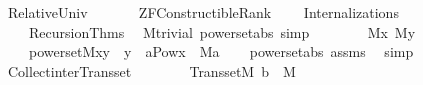 %
\begin{isabellebody}%
%
%
\isadelimdocument
%
\endisadelimdocument
%
\isatagdocument
%
\isamarkuptrue%
%
\endisatagdocument
{\isafolddocument}%
%
\isadelimdocument
%
\endisadelimdocument
%
\isadelimtheory
%
\endisadelimtheory
%
\isatagtheory
{}\isamarkupfalse%
\ Relative{\isacharunderscore}{\kern0pt}Univ\isanewline
\ \ \isanewline
\ \ \ \ {\isachardoublequoteopen}ZF{\isacharminus}{\kern0pt}Constructible{\isachardot}{\kern0pt}Rank{\isachardoublequoteclose}\isanewline
\ \ \ \ Internalizations\isanewline
\ \ \ \ Recursion{\isacharunderscore}{\kern0pt}Thms\isanewline
\isanewline
{}%
\endisatagtheory
{\isafoldtheory}%
%
\isadelimtheory
\isanewline
%
\endisadelimtheory
\isanewline
{}\isamarkupfalse%
\ {\isacharparenleft}{\kern0pt}\ M{\isacharunderscore}{\kern0pt}trivial{\isacharparenright}{\kern0pt}\ powerset{\isacharunderscore}{\kern0pt}abs{\isacharprime}{\kern0pt}\ {\isacharbrackleft}{\kern0pt}simp{\isacharbrackright}{\kern0pt}{\isacharcolon}{\kern0pt}\ \isanewline
\ \ \isanewline
\ \ \ \ {\isachardoublequoteopen}M{\isacharparenleft}{\kern0pt}x{\isacharparenright}{\kern0pt}{\isachardoublequoteclose}\ {\isachardoublequoteopen}M{\isacharparenleft}{\kern0pt}y{\isacharparenright}{\kern0pt}{\isachardoublequoteclose}\isanewline
\ \ \isanewline
\ \ \ \ {\isachardoublequoteopen}powerset{\isacharparenleft}{\kern0pt}M{\isacharcomma}{\kern0pt}x{\isacharcomma}{\kern0pt}y{\isacharparenright}{\kern0pt}\ {\isasymlongleftrightarrow}\ y\ {\isacharequal}{\kern0pt}\ {\isacharbraceleft}{\kern0pt}a{\isasymin}Pow{\isacharparenleft}{\kern0pt}x{\isacharparenright}{\kern0pt}\ {\isachardot}{\kern0pt}\ M{\isacharparenleft}{\kern0pt}a{\isacharparenright}{\kern0pt}{\isacharbraceright}{\kern0pt}{\isachardoublequoteclose}\isanewline
%
\isadelimproof
\ \ %
\endisadelimproof
%
\isatagproof
{}\isamarkupfalse%
\ powerset{\isacharunderscore}{\kern0pt}abs\ assms\ \isamarkupfalse%
\ simp%
\endisatagproof
{\isafoldproof}%
%
\isadelimproof
\isanewline
%
\endisadelimproof
\isanewline
{}\isamarkupfalse%
\ Collect{\isacharunderscore}{\kern0pt}inter{\isacharunderscore}{\kern0pt}Transset{\isacharcolon}{\kern0pt}\isanewline
\ \ \ \isanewline
\ \ \ \ {\isachardoublequoteopen}Transset{\isacharparenleft}{\kern0pt}M{\isacharparenright}{\kern0pt}{\isachardoublequoteclose}\ {\isachardoublequoteopen}b\ {\isasymin}\ M{\isachardoublequoteclose}\isanewline

\end{isabellebody}
